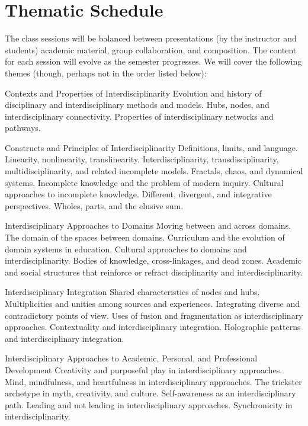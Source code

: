 \documentclass[letterpaper,10pt,headsepline]{scrreprt}
\begin{document}
\section{Thematic Schedule}
The class sessions will be balanced between presentations (by the instructor and students) academic material, group collaboration, and composition. The content for each session will evolve as the semester progresses. We will cover the following themes (though, perhaps not in the order listed below):
\\
\begin{compactdesc}
\item[Contexts and Properties of Interdisciplinarity]
Evolution and history of disciplinary and interdisciplinary methods and models. Hubs, nodes, and interdisciplinary connectivity. Properties of interdisciplinary networks and pathways.
\\
\item[Constructs and Principles of Interdisciplinarity]
Definitions, limits, and language. Linearity, nonlinearity, translinearity. Interdisciplinarity, transdisciplinarity, multidisciplinarity, and related incomplete models. Fractals, chaos, and dynamical systems. Incomplete knowledge and the problem of modern inquiry. Cultural approaches to incomplete knowledge. Different, divergent, and integrative perspectives. Wholes, parts, and the elusive sum.
\\
\item[Interdisciplinary Approaches to Domains]
Moving between and across domains. The domain of the spaces between domains. Curriculum and the evolution of domain systems in education. Cultural approaches to domains and interdisciplinarity. Bodies of knowledge, cross-linkages, and dead zones. Academic and social structures that reinforce or refract disciplinarity and interdisciplinarity.
\\
\item[Interdisciplinary Integration]
Shared characteristics of nodes and hubs. Multiplicities and unities among sources and experiences. Integrating diverse and contradictory points of view. Uses of fusion and fragmentation as interdisciplinary approaches. Contextuality and interdisciplinary integration. Holographic patterns and interdisciplinary integration.
\\
\item[Interdisciplinary Approaches to Academic, Personal, and Professional Development]
Creativity and purposeful play in interdisciplinary approaches. Mind, mindfulness, and heartfulness in interdisciplinary approaches. The trickster archetype in myth, creativity, and culture. Self-awareness as an interdisciplinary path. Leading and not leading in interdisciplinary approaches. Synchronicity in interdisciplinarity.

\end{compactdesc}
\end{document}
